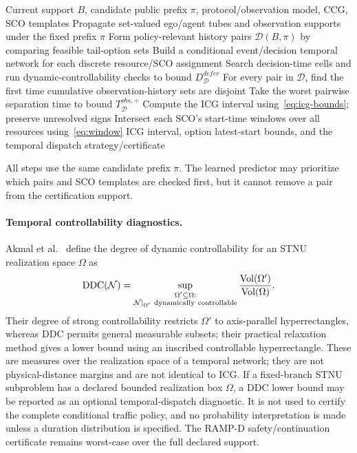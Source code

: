 \documentclass[letterpaper]{article} %
\begin{document}
\begin{algorithm}[t]
\footnotesize
\caption{Candidate-conditioned ICG and option-deadline computation}
\label{alg:icg}
\begin{algorithmic}[1]
\Require Current support $B$, candidate public prefix $\pi$, protocol/observation model, CCG, SCO templates
\State Propagate set-valued ego/agent tubes and observation supports under the fixed prefix $\pi$
\State Form policy-relevant history pairs $\mathcal D(B,\pi)$ by comparing feasible tail-option sets
\State Build a conditional event/decision temporal network for each discrete resource/SCO assignment
\State Search decision-time cells and run dynamic-controllability checks to bound $D_{\mathcal D}^{defer}$
\State For every pair in $\mathcal D$, find the first time cumulative observation-history sets are disjoint
\State Take the worst pairwise separation time to bound $T_{\mathcal D}^{obs,+}$
\State Compute the ICG interval using~\eqref{eq:icg-bounds}; preserve unresolved signs
\State Intersect each SCO's start-time windows over all resources using~\eqref{eq:window}
\State \Return ICG interval, option latest-start bounds, and the temporal dispatch strategy/certificate
\end{algorithmic}
\end{algorithm}

All steps use the same candidate prefix $\pi$. The learned predictor may prioritize which pairs and SCO templates are checked first, but it cannot remove a pair from the certification support.

\paragraph{Temporal controllability diagnostics.}
Akmal et al.~\citep{akmal2020quantifying} define the degree of dynamic controllability for an STNU realization space $\Omega$ as
\begin{equation}
\operatorname{DDC}(\mathcal N)=
\sup_{\substack{\Omega'\subseteq\Omega:\\
\mathcal N|_{\Omega'}\ {\rm dynamically\ controllable}}}
\frac{\operatorname{Vol}(\Omega')}{\operatorname{Vol}(\Omega)}.
\label{eq:ddc}
\end{equation}
Their degree of strong controllability restricts $\Omega'$ to axis-parallel hyperrectangles, whereas DDC permits general measurable subsets; their practical relaxation method gives a lower bound using an inscribed controllable hyperrectangle. These are measures over the realization space of a temporal network; they are not physical-distance margins and are not identical to ICG. If a fixed-branch STNU subproblem has a declared bounded realization box $\Omega$, a DDC lower bound may be reported as an optional temporal-dispatch diagnostic. It is not used to certify the complete conditional traffic policy, and no probability interpretation is made unless a duration distribution is specified. The RAMP-D safety/continuation certificate remains worst-case over the full declared support.
\end{document}
